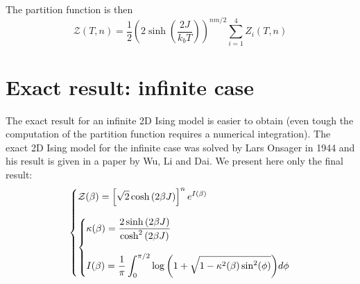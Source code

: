 \documentclass[11pt]{article}
\makeatletter
\newenvironment{system}
		{\left\lbrace\begin{array}{@{}l@{}}}
		{\end{array}\right.}
\makeatother
\begin{document}
The partition function is then
\[
\mathcal Z(T,n) = \frac{1}{2}\left(2\sinh{\left(\frac{2J}{k_bT}\right)}\right)^{nm/2}
					\sum_{i=1}^4 Z_i(T,n)
\]

\section{Exact result: infinite case}
\label{app:exact_infinite}

The exact result for an infinite 2D Ising model is easier to obtain (even tough the computation of the partition function requires a numerical integration). The exact 2D Ising model for the infinite case was solved by Lars Onsager in 1944 and his result is given in a paper by Wu, Li and Dai\cite{bib:exact2}. We present here only the final result:
\[
\begin{system}
\displaystyle \mathcal Z(\beta) = 
			\left[\sqrt{2}\cosh{(2\beta J)}\right]^n e^{I(\beta)} 				\\
\\
\begin{system}
	\displaystyle \kappa(\beta) = 
					\frac{2\sinh{(2\beta J)}}{\cosh^2{(2\beta J)}}			\\
	\\
	\displaystyle I(\beta) = 	
					\frac{1}{\pi}\int_0^{\pi/2}
					\log{\left(1 + \sqrt{1 - \kappa^2(\beta)\sin^2(\phi)}\right)}
					d\phi
	\end{system}
\end{system}
\]



\end{document}
